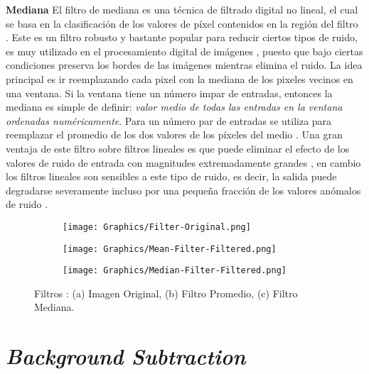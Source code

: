\textbf{Mediana}
El filtro de mediana es una técnica de filtrado digital no lineal, el cual se basa en la clasificación de los valores de píxel contenidos en la región del filtro \cite{MandarMeghana}. Este es un filtro robusto y bastante popular para reducir ciertos tipos de ruido, es muy utilizado en el procesamiento digital de imágenes \cite{RuchikaGaurav}, puesto que bajo ciertas condiciones preserva los bordes de las imágenes mientras elimina el ruido. La idea principal es ir reemplazando cada pixel con la mediana de los pixeles vecinos en una ventana. Si la ventana tiene un número impar de entradas, entonces la mediana es simple de definir: \textit{valor medio de todas las entradas en la ventana ordenadas numéricamente}. Para un número par de entradas se utiliza para reemplazar el promedio de los dos valores de los píxeles del medio \cite{PawanManojSumitAshok}. Una gran ventaja de este filtro sobre filtros lineales es que puede eliminar el efecto de los valores de ruido de entrada con magnitudes extremadamente grandes \cite{MandarMeghana}, en cambio los filtros lineales son sensibles a este tipo de ruido, es decir, la salida puede degradarse severamente incluso por una pequeña fracción de los valores anómalos de ruido \cite{JamesYixinStephen, PawanManojSumitAshok}.

\begin{figure}[h!]
    \centering
    \begin{subfigure}[b]{0.32\linewidth}
        \centering
	    \texttt{[image: Graphics/Filter-Original.png]}
        \caption{}
    \end{subfigure}
    \begin{subfigure}[b]{0.32\linewidth}
        \centering
	    \texttt{[image: Graphics/Mean-Filter-Filtered.png]}
        \caption{}
    \end{subfigure}    
    \begin{subfigure}[b]{0.32\linewidth}
        \centering
	    \texttt{[image: Graphics/Median-Filter-Filtered.png]}
        \caption{}
    \end{subfigure}    
    \caption{Filtros : (a) Imagen Original, (b) Filtro Promedio, (c) Filtro Mediana.}
    \label{fig:filters}
\end{figure}    

\section{\textit{Background Subtraction}}\label{sec:BS}

